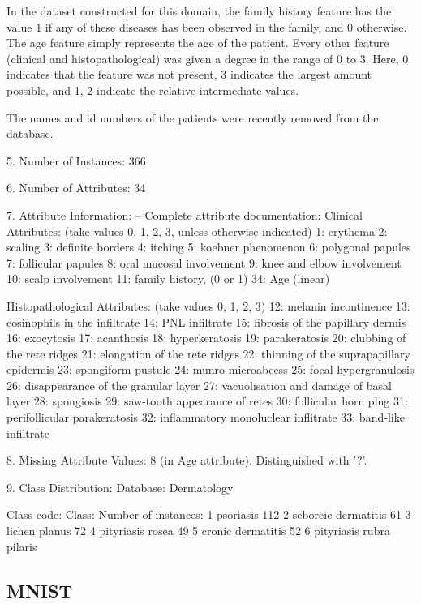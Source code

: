 \documentclass[letterpaper,12pt,titlepage,oneside,final]{book}
\begin{document}
	In the dataset constructed for this domain, the family history feature
	has the value 1 if any of these diseases has been observed in the
	family, and 0 otherwise. The age feature simply represents the age of
	the patient. Every other feature (clinical and histopathological) was
	given a degree in the range of 0 to 3. Here, 0 indicates that the
	feature was not present, 3 indicates the largest amount possible,
	and 1, 2 indicate the relative intermediate values.
	
	The names and id numbers of the patients were recently 
	removed from the database.
	
	5. Number of Instances: 366
	
	6. Number of Attributes: 34
	
	7. Attribute Information:
	-- Complete attribute documentation:
	Clinical Attributes: (take values 0, 1, 2, 3, unless otherwise indicated)
	1: erythema
	2: scaling
	3: definite borders
	4: itching
	5: koebner phenomenon
	6: polygonal papules
	7: follicular papules
	8: oral mucosal involvement
	9: knee and elbow involvement
	10: scalp involvement
	11: family history, (0 or 1)
	34: Age (linear)
	
	Histopathological Attributes: (take values 0, 1, 2, 3)
	12: melanin incontinence
	13: eosinophils in the infiltrate
	14: PNL infiltrate
	15: fibrosis of the papillary dermis
	16: exocytosis
	17: acanthosis
	18: hyperkeratosis
	19: parakeratosis
	20: clubbing of the rete ridges
	21: elongation of the rete ridges
	22: thinning of the suprapapillary epidermis
	23: spongiform pustule
	24: munro microabcess
	25: focal hypergranulosis
	26: disappearance of the granular layer
	27: vacuolisation and damage of basal layer
	28: spongiosis
	29: saw-tooth appearance of retes
	30: follicular horn plug
	31: perifollicular parakeratosis
	32: inflammatory monoluclear inflitrate
	33: band-like infiltrate
	
	8. Missing Attribute Values: 8 (in Age attribute). Distinguished with '?'.
	
	9. Class Distribution:
	Database:  Dermatology
	
	Class code:   Class:                  Number of instances:
	1             psoriasis			    112
	2             seboreic dermatitis             61
	3             lichen planus                   72
	4             pityriasis rosea                49
	5             cronic dermatitis               52    
	6             pityriasis rubra pilaris    
	
	\subsection{MNIST}
	
\end{document}
